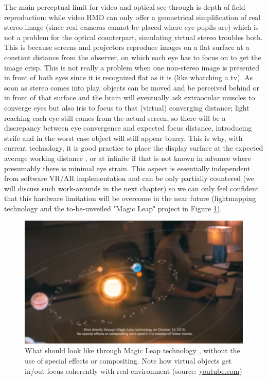 The main perceptual limit for video and optical see-through is depth of field reproduction: while video HMD can only offer a geometrical simplification of real stereo image (since real cameras cannot be placed where eye pupils are) which is not a problem for the optical counterpart, simulating virtual stereo troubles both. This is because screens and projectors reproduce images on a flat surface at a constant distance from the observer, on which each eye has to focus on to get the image crisp. This is not really a problem when one non-stereo image is presented in front of both eyes since it is recognized flat as it is (like whatching a tv). As soon as stereo comes into play, objects can be moved and be perceived behind or in front of that surface and the brain will eventually ask extraocular muscles to converge eyes but also iris to focus to that (virtual) converging distance; light reaching each eye still comes from the actual screen, so there will be a discrepancy between eye convergence and expected focus distance, introducing strife and in the worst case object will still appear blurry. This is why, with current technology, it is good practice to place the display surface at the expected average working distance \cite{stereo_rules}, or at infinite if that is not known in advance where presumably there is minimal eye strain. This aspect is essentially independent from software VR/AR implementation and can be only partially countered (we will discuss such work-arounds in the next chapter) so we can only feel confident that this hardware limitation will be overcome in the near future (lightmapping technology \cite{light_field_mapping} and the to-be-unveiled "Magic Leap" project \cite{magic_leap} in Figure \ref{fig:magic_leap}).

\begin{figure}
\centering
\includegraphics[width=13cm]{pictures/magic_leap}
\caption{What should look like through Magic Leap technology \cite{magic_leap}, without the use of special effects or compositing. Note how virtual objects get in/out focus coherently with real environment (source: \href{https://www.youtube.com/watch?v=kw0-JRa9n94}{youtube.com})}
\label{fig:magic_leap}
\end{figure}

